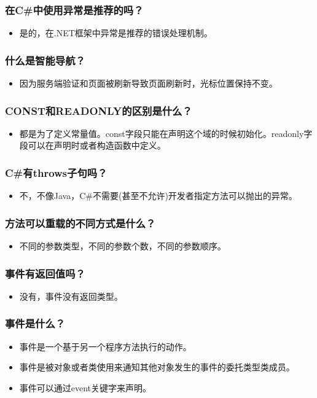 \documentclass[9pt, b5paper]{article}
\begin{document}
\subsubsection{在C\#中使用异常是推荐的吗？}
\label{sec-1-2-27}
\begin{itemize}
\item 是的，在.NET框架中异常是推荐的错误处理机制。
\end{itemize}
\subsubsection{什么是智能导航？}
\label{sec-1-2-28}
\begin{itemize}
\item 因为服务端验证和页面被刷新导致页面刷新时，光标位置保持不变。
\end{itemize}
\subsubsection{CONST和READONLY的区别是什么？}
\label{sec-1-2-29}
\begin{itemize}
\item 都是为了定义常量值。const字段只能在声明这个域的时候初始化。readonly字段可以在声明时或者构造函数中定义。
\end{itemize}
\subsubsection{C\#有throws子句吗？}
\label{sec-1-2-30}
\begin{itemize}
\item 不，不像Java，C\#不需要(甚至不允许)开发者指定方法可以抛出的异常。
\end{itemize}
\subsubsection{方法可以重载的不同方式是什么？}
\label{sec-1-2-31}
\begin{itemize}
\item 不同的参数类型，不同的参数个数，不同的参数顺序。
\end{itemize}
\subsubsection{事件有返回值吗？}
\label{sec-1-2-32}
\begin{itemize}
\item 没有，事件没有返回类型。
\end{itemize}
\subsubsection{事件是什么？}
\label{sec-1-2-33}
\begin{itemize}
\item 事件是一个基于另一个程序方法执行的动作。
\item 事件是被对象或者类使用来通知其他对象发生的事件的委托类型类成员。
\item 事件可以通过event关键字来声明。
\end{itemize}
\end{document}
